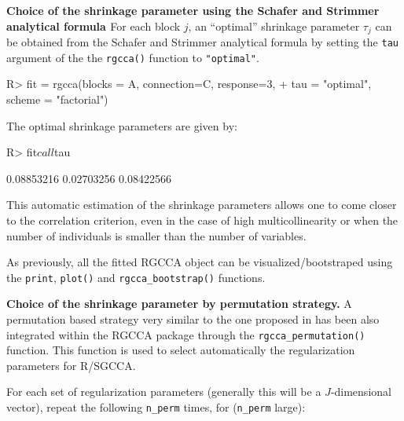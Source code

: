 \documentclass[
]{jss}
\begin{document}
\textbf{Choice of the shrinkage parameter using the Schafer and Strimmer
analytical formula \citep{Schafer2005}} For each block \(j\), an
``optimal'' shrinkage parameter \(\tau_j\) can be obtained from the
Schafer and Strimmer analytical formula \citep{Schafer2005} by setting
the \texttt{tau} argument of the the \texttt{rgcca()} function to
\texttt{"optimal"}.

\footnotesize

\begin{CodeChunk}
\begin{CodeInput}
R> fit = rgcca(blocks = A, connection=C, response=3,
+             tau = "optimal", scheme = "factorial")
\end{CodeInput}
\end{CodeChunk}

\normalsize

The optimal shrinkage parameters are given by:

\footnotesize

\begin{CodeChunk}
\begin{CodeInput}
R> fit$call$tau
\end{CodeInput}
\begin{CodeOutput}
[1] 0.08853216 0.02703256 0.08422566
\end{CodeOutput}
\end{CodeChunk}

\normalsize

This automatic estimation of the shrinkage parameters allows one to come
closer to the correlation criterion, even in the case of high
multicollinearity or when the number of individuals is smaller than the
number of variables.

As previously, all the fitted RGCCA object can be visualized/bootstraped
using the \texttt{print}, \texttt{plot()} and
\texttt{rgcca\_bootstrap()} functions.

\textbf{Choice of the shrinkage parameter by permutation strategy.} A
permutation based strategy very similar to the one proposed in
\citep{Witten2009a} has been also integrated within the RGCCA package
through the \texttt{rgcca\_permutation()} function. This function is
used to select automatically the regularization parameters for R/SGCCA.

For each set of regularization parameters (generally this will be a
\(J\)-dimensional vector), repeat the following \texttt{n\_perm} times,
for (\texttt{n\_perm} large):
\end{document}
